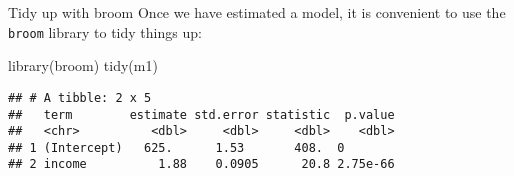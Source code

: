 \documentclass[
  10pt,
  ignorenonframetext,
  t, svgnames, handout]{beamer}
\newenvironment{Shaded}{\begin{snugshade}}{\end{snugshade}}
\newcommand{\FunctionTok}[1]{\textcolor[rgb]{0.00,0.00,0.00}{#1}}
\newcommand{\NormalTok}[1]{#1}
\begin{document}
\begin{frame}[fragile]{Tidy up with broom}
\protect\hypertarget{tidy-up-with-broom}{}
Once we have estimated a model, it is convenient to use the
\texttt{broom} library to tidy things up:

\scriptsize

\begin{Shaded}
\begin{Highlighting}[]
\FunctionTok{library}\NormalTok{(broom)}
\FunctionTok{tidy}\NormalTok{(m1)}
\end{Highlighting}
\end{Shaded}

\begin{verbatim}
## # A tibble: 2 x 5
##   term        estimate std.error statistic  p.value
##   <chr>          <dbl>     <dbl>     <dbl>    <dbl>
## 1 (Intercept)   625.      1.53       408.  0       
## 2 income          1.88    0.0905      20.8 2.75e-66
\end{verbatim}

\normalsize
\end{frame}
\end{document}
